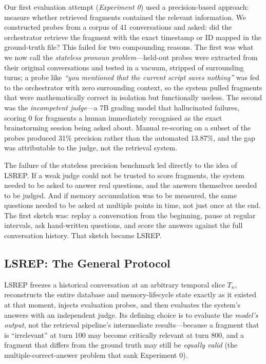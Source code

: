 \documentclass[11pt,a4paper]{article}
\begin{document}
Our first evaluation attempt (\emph{Experiment 0}) used a precision-based approach: measure whether retrieved fragments contained the relevant information. We constructed probes from a corpus of 41 conversations and asked: did the orchestrator retrieve the fragment with the exact timestamp or ID mapped in the ground-truth file? This failed for two compounding reasons. The first was what we now call the \emph{stateless pronoun problem}---held-out probes were extracted from their original conversations and tested in a vacuum, stripped of surrounding turns; a probe like \emph{``you mentioned that the current script saves nothing''} was fed to the orchestrator with zero surrounding context, so the system pulled fragments that were mathematically correct in isolation but functionally useless. The second was the \emph{incompetent judge}---a 7B grading model that hallucinated failures, scoring 0 for fragments a human immediately recognised as the exact brainstorming session being asked about. Manual re-scoring on a subset of the probes produced 31\% precision rather than the automated 13.87\%, and the gap was attributable to the judge, not the retrieval system.

The failure of the stateless precision benchmark led directly to the idea of LSREP. If a weak judge could not be trusted to score fragments, the system needed to be asked to answer real questions, and the answers themselves needed to be judged. And if memory accumulation was to be measured, the same questions needed to be asked at multiple points in time, not just once at the end. The first sketch was: replay a conversation from the beginning, pause at regular intervals, ask hand-written questions, and score the answers against the full conversation history. That sketch became LSREP.

\subsection{LSREP: The General Protocol}
\label{sec:lsrep}

LSREP freezes a historical conversation at an arbitrary temporal slice $T_n$, reconstructs the entire database and memory-lifecycle state exactly as it existed at that moment, injects evaluation probes, and then evaluates the system's answers with an independent judge. Its defining choice is to evaluate the \emph{model's output}, not the retrieval pipeline's intermediate results---because a fragment that is ``irrelevant'' at turn 100 may become critically relevant at turn 800, and a fragment that differs from the ground truth may still be \emph{equally valid} (the multiple-correct-answer problem that sank Experiment 0).
\end{document}
